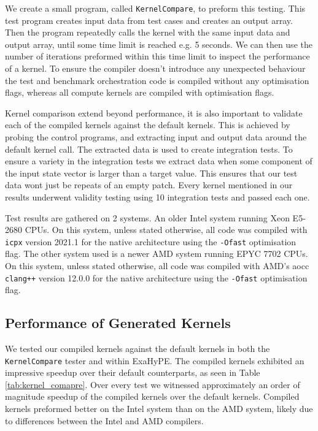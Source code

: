 We create a small program, called \texttt{KernelCompare}, to preform this testing.
This test program creates input data from test cases and creates an output array.
Then the program repeatedly calls the kernel with the same input data and output array, until some time limit is reached e.g. 5 seconds.
We can then use the number of iterations preformed within this time limit to inspect the performance of a kernel.
To ensure the compiler doesn't introduce any unexpected behaviour the test and benchmark orchestration code is compiled without any optimisation flags, whereas all compute kernels are compiled with optimisation flags.

Kernel comparison extend beyond performance, it is also important to validate each of the compiled kernels against the default kernels.
This is achieved by probing the control programs, and extracting input and output data around the default kernel call.
The extracted data is used to create integration tests.
To ensure a variety in the integration tests we extract data when some component of the input state vector is larger than a target value. 
This ensures that our test data wont just be repeats of an empty patch.
Every kernel mentioned in our results underwent validity testing using 10 integration tests and passed each one.

Test results are gathered on 2 systems.
An older Intel system running Xeon E5-2680 CPUs.
On this system, unless stated otherwise, all code was compiled with \texttt{icpx} version 2021.1 for the native architecture using the \texttt{-Ofast} optimisation flag.
The other system used is a newer AMD system running EPYC 7702 CPUs.
On this system, unless stated otherwise, all code was compiled with AMD's aocc \texttt{clang++} version 12.0.0 for the native architecture using the \texttt{-Ofast} optimisation flag. 

\subsection{Performance of Generated Kernels}

We tested our compiled kernels against the default kernels in both the \texttt{KernelCompare} tester and within ExaHyPE.
The compiled kernels exhibited an impressive speedup over their default counterparts, as seen in Table \ref{tab:kernel_comapre}.
Over every test we witnessed approximately an order of magnitude speedup of the compiled kernels over the default kernels.
Compiled kernels preformed better on the Intel system than on the AMD system, likely due to differences between the Intel and AMD compilers. 

